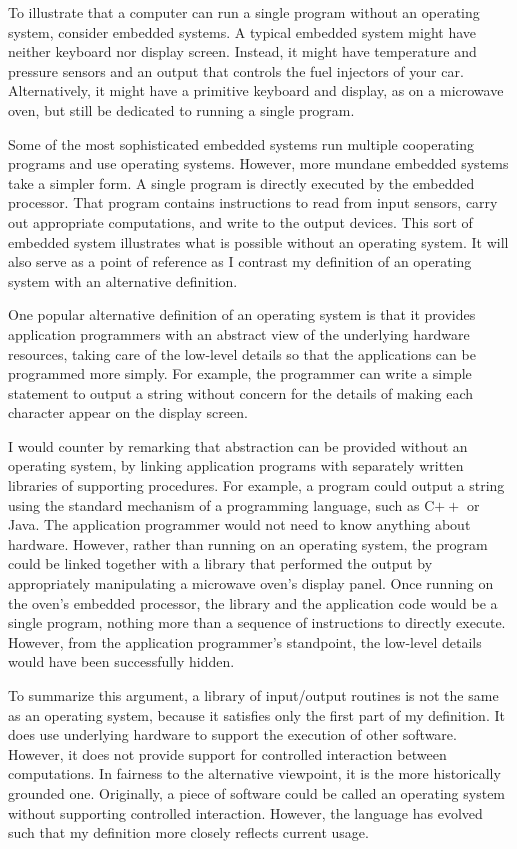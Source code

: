To illustrate that a computer can run a single program without an
operating system, consider embedded systems.  A typical
embedded system might have neither keyboard nor display screen.
Instead, it might have temperature and pressure sensors and an output
that controls the fuel injectors of your car.  Alternatively, it might have
a primitive keyboard and display, as on a microwave oven, but still
be dedicated to running a single program.

Some of the most sophisticated embedded systems run multiple
cooperating programs and use operating systems.  However, more
mundane embedded systems take a simpler form.  A single program is
directly executed by the embedded processor.  That program contains
instructions to read from input sensors, carry out appropriate
computations, and write to the output devices.  This sort of embedded
system illustrates what is possible without an operating system.  It
will also serve as a point of reference as I contrast my definition of an
operating system with an alternative definition.

One popular alternative definition of an operating system is that it
provides application programmers with an abstract view of the
underlying hardware resources, taking care of the low-level details so
that the applications can be programmed more simply.  For example, the
programmer can write a simple statement to output a string without
concern for the details of making each character appear on the display
screen.

I would counter by remarking that abstraction can be provided without
an operating system, by linking application programs with separately
written libraries of supporting procedures.  For example, a program
could output a string using the standard mechanism of a programming
language, such as C$++$ or Java.  The application programmer would not
need to know anything about hardware.  However, rather than running on an
operating system, the program could be linked together with a library
that performed the output by appropriately manipulating a microwave
oven's display panel.  Once running on the oven's embedded processor,
the library and the application code would be a single program,
nothing more than a sequence of instructions to directly execute.
However, from the application programmer's standpoint, the low-level
details would have been successfully hidden.

To summarize this argument, a library of input/output routines is not
the same as an operating system, because it satisfies only the first
part of my definition.  It does use underlying hardware to support the
execution of other software.  However, it does not provide support for
controlled interaction between computations.  In fairness to the
alternative viewpoint, it is the more historically grounded one.
Originally, a piece of software could be called an operating system
without supporting controlled interaction.  However, the language has
evolved such that my definition more closely reflects current usage.


